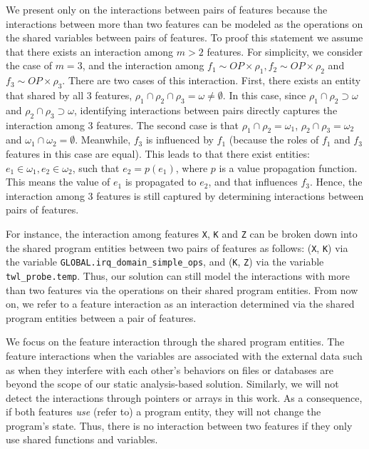 
We present only on the interactions between pairs of features because
the interactions between more than two features can be modeled as the
operations on the shared variables between pairs of features.  To
proof this statement we assume that there exists an interaction among
$m > 2$ features. For simplicity, we consider the case of $m=3$, and
the interaction among $f_1\sim OP \times \rho_1, f_2\sim OP \times
\rho_2$ and $f_3\sim OP \times \rho_3$. There are two cases of this
interaction. First, there exists an entity that shared by all 3
features, $\rho_1 \cap \rho_2 \cap \rho_3 = \omega \neq \emptyset$. In
this case, since $\rho_1 \cap \rho_2 \supset \omega$ and $\rho_2
\cap \rho_3 \supset \omega$, identifying interactions between pairs
directly captures the interaction among 3 features. The second case is
that $\rho_1 \cap \rho_2 = \omega_1$, $\rho_2 \cap \rho_3 = \omega_2$
and $\omega_1 \cap \omega_2 = \emptyset$. Meanwhile, $f_3$ is
influenced by $f_1$ (because the roles of $f_1$ and $f_3$
  features in this case are equal). This leads to that there exist
entities: $e_1 \in \omega_1, e_2 \in \omega_2$, such that $e_2 =
p(e_1)$, where $p$ is a value propagation function. This means the
value of $e_1$ is propagated to $e_2$, and that influences
$f_3$. Hence, the interaction among 3 features is still captured by
determining interactions between pairs of features.

For instance, the interaction among features \texttt{X}, \texttt{K} and \texttt{Z} can be broken
down into the shared program entities between two pairs of features as
follows: (\texttt{X}, \texttt{K}) via the variable \texttt{GLOBAL.irq\_domain\_\-simple\_ops}, and
(\texttt{K}, \texttt{Z}) via the variable \texttt{twl\_probe.temp}.
%
%
%
Thus, our solution can still model the interactions with more than two
features via the operations on their shared program entities.
%
From now on, we refer to a feature interaction as an
interaction determined via the shared program entities between
a pair of features.


We focus on the feature interaction through the shared
program entities. The feature interactions when the variables are
associated with the external data such as when they interfere with
each other's behaviors on files or databases are beyond the scope of
our static analysis-based solution. Similarly, we will not detect the
interactions through pointers or arrays in this work.  As a
consequence, if both features {\em use} (refer to) a program entity,
they will not change the program's state. Thus, there is no
interaction between two features if they only use shared functions and
variables.

